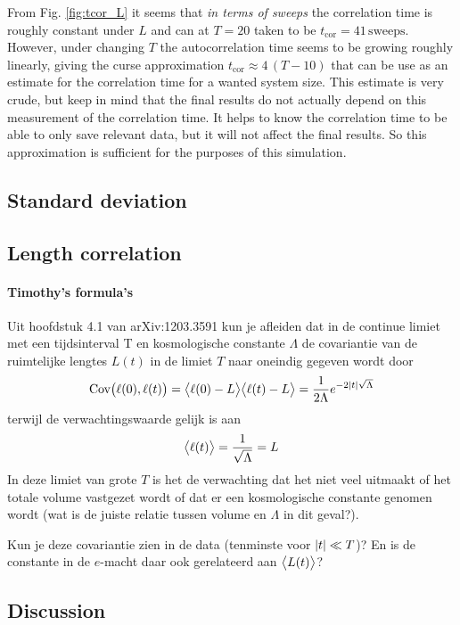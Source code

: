 From Fig. \ref{fig:tcor_L} it seems that \emph{in terms of sweeps} the correlation time is roughly constant under $L$ and can at $T = 20$ taken to be $t_\text{cor} = 41 \, \text{sweeps}$.
However, under changing $T$ the autocorrelation time seems to be growing roughly linearly, giving the curse approximation $t_\text{cor} \approx 4\, (T - 10)$ that can be use as an estimate for the correlation time for a wanted system size.
This estimate is very crude, but keep in mind that the final results do not actually depend on this measurement of the correlation time. It helps to know the correlation time to be able to only save relevant data, but it will not affect the final results.
So this approximation is sufficient for the purposes of this simulation.

\subsection{Standard deviation}

\subsection{Length correlation}
\paragraph{Timothy's formula's}
Uit hoofdstuk 4.1 van arXiv:1203.3591 kun je afleiden dat in de continue
limiet met een tijdsinterval T en kosmologische constante $\Lambda$ de
covariantie van de ruimtelijke lengtes $L(t)$ in de limiet $T$ naar oneindig gegeven wordt door
\begin{equation}
    \text{Cov}\big(\ell(0), \ell(t)\big) = \big\langle \ell(0) - L \big\rangle \big\langle \ell(t) - L \big\rangle
    = \frac{1}{2\Lambda} e^{- 2\abs{t}\sqrt{\Lambda}}
\end{equation}
terwijl de verwachtingswaarde gelijk is aan
\begin{equation}
    \big\langle \ell(t) \big\rangle = \frac{1}{\sqrt{\Lambda}} = L
\end{equation}
In deze limiet van grote $T$ is het de verwachting dat het niet veel
uitmaakt of het totale volume vastgezet wordt of dat er een
kosmologische constante genomen wordt (wat is de juiste relatie tussen
volume en $\Lambda$ in dit geval?).

Kun je deze covariantie zien in de data (tenminste voor $\abs{t} \ll T$)? En is
de constante in de $e$-macht daar ook gerelateerd aan $\big\langle L(t) \big\rangle$?



\subsection{Discussion}
